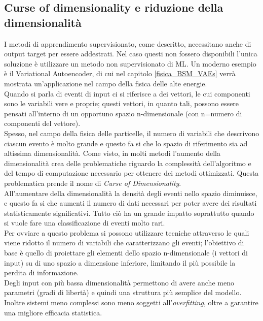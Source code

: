 \newpage


\subsection{Curse of dimensionality e riduzione della dimensionalità}
\label{curse_dim}

I metodi di apprendimento supervisionato, come descritto, necessitano anche di output target per essere addestrati. Nel caso questi non fossero disponibili l'unica soluzione è utilizzare un metodo non supervisionato di ML. Un moderno esempio è il Variational Autoencoder, di cui nel capitolo \ref{fisica_BSM_VAEs} verrà mostrata un'applicazione nel campo della fisica delle alte energie. \\
Quando si parla di eventi di input ci si riferisce a dei vettori, le cui componenti sono le variabili vere e proprie; questi vettori, in quanto tali, possono essere pensati all'interno di un opportuno spazio n-dimensionale (con n=numero di componenti del vettore).\\
Spesso, nel campo della fisica delle particelle, il numero di variabili che descrivono ciascun evento è molto grande e  questo fa si che lo spazio di riferimento sia ad altissima dimensionalità. Come visto, in molti metodi l'aumento della dimensionalità crea delle problematiche riguardo la complessità dell'algoritmo e del tempo di computazione necessario per ottenere dei metodi ottimizzati. Questa problematica prende il nome di \textit{Curse of Dimensionality}. \\
All'aumentare della dimensionalità la densità degli eventi nello spazio diminuisce, e questo fa si che aumenti il numero di dati necessari per poter avere dei risultati statisticamente significativi. Tutto ciò ha un grande impatto soprattutto quando si vuole fare una classificazione di eventi molto rari.\\
Per ovviare a questo problema si possono utilizzare tecniche attraverso le quali viene ridotto il numero di variabili che caratterizzano gli eventi; l'obiettivo di base è quello di proiettare gli elementi dello spazio n-dimensionale (i vettori di input) su di uno spazio a dimensione inferiore, limitando il più possibile la perdita di informazione.\\
Degli input con più bassa dimensionalità permettono di avere anche meno parametri (gradi di libertà) e quindi una struttura più semplice del modello. Inoltre sistemi meno complessi sono meno soggetti all'\textit{overfitting}, oltre a garantire una migliore efficacia statistica. \\
